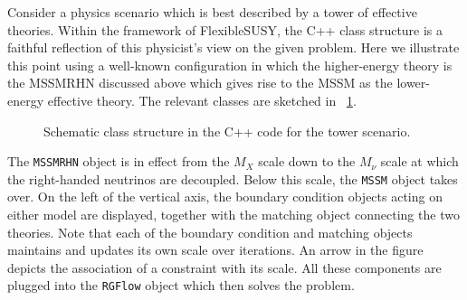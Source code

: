 \documentclass[final,3p,11pt,pdflatex]{elsarticle}
\makeatletter
\newcommand{\fs}{FlexibleSUSY\@\xspace}
\newcommand{\code}[1]{\lstinline|#1|}  %
\newcommand{\figref}[1]{\figurename~\ref{#1}}
\makeatother
\begin{document}
Consider a physics scenario which is best described
by a tower of effective theories.
Within the framework of \fs, the C++ class structure is
a faithful reflection of
this physicist's view on the given problem.
Here we illustrate this point
using a well-known configuration in which
the higher-energy theory is the MSSMRHN discussed above which
gives rise to the MSSM as the lower-energy effective theory.
The relevant classes are sketched
in \figref{fig:class structure for tower}.
\begin{figure}
  \centering
{}
  \caption{Schematic class structure in the C++ code for
    the tower scenario.}
  \label{fig:class structure for tower}
\end{figure}
The \code{MSSMRHN} object is in effect from the $M_X$ scale down to
the $M_\nu$ scale at which the right-handed neutrinos are decoupled.
Below this scale, the \code{MSSM} object takes over.
On the left of the vertical axis,
the boundary condition objects acting on either model are displayed,
together with the matching object connecting the two theories.
Note that each of the boundary condition and matching objects
maintains and updates its own scale over iterations.
An arrow in the figure depicts
the association of a constraint with its scale.
All these components are plugged into the \code{RGFlow} object
which then solves the problem.
\end{document}
